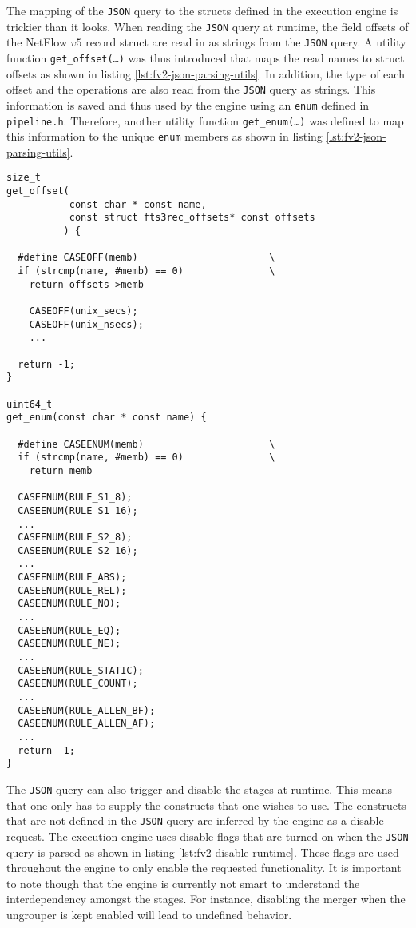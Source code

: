 The mapping of the \texttt{JSON} query to the structs defined in the execution
engine is trickier than it looks. When reading the \texttt{JSON} query at
runtime, the field offsets of the NetFlow $v5$ record struct are read in as
strings from the \texttt{JSON} query. A utility function
\texttt{get\_offset(\ldots)} was thus 
introduced that maps the read names to struct offsets as shown in listing
\ref{lst:fv2-json-parsing-utils}.  In addition, the type of each offset and
the operations are also read from the \texttt{JSON} query as strings. This
information is saved and thus used by the engine using an \texttt{enum}
defined in \texttt{pipeline.h}.  Therefore, another utility function
\texttt{get\_enum(\ldots)} was defined to map this information to the unique
\texttt{enum} members as shown in listing \ref{lst:fv2-json-parsing-utils}.


\begin{lstlisting}
size_t
get_offset(
           const char * const name,
           const struct fts3rec_offsets* const offsets
          ) {

  #define CASEOFF(memb)                       \
  if (strcmp(name, #memb) == 0)               \
    return offsets->memb

    CASEOFF(unix_secs);
    CASEOFF(unix_nsecs);
    ...

  return -1;
}

uint64_t
get_enum(const char * const name) {

  #define CASEENUM(memb)                      \
  if (strcmp(name, #memb) == 0)               \
    return memb

  CASEENUM(RULE_S1_8);
  CASEENUM(RULE_S1_16);
  ...
  CASEENUM(RULE_S2_8);
  CASEENUM(RULE_S2_16);
  ...
  CASEENUM(RULE_ABS);
  CASEENUM(RULE_REL);
  CASEENUM(RULE_NO);
  ...
  CASEENUM(RULE_EQ);
  CASEENUM(RULE_NE);
  ...
  CASEENUM(RULE_STATIC);
  CASEENUM(RULE_COUNT);
  ...
  CASEENUM(RULE_ALLEN_BF);
  CASEENUM(RULE_ALLEN_AF);
  ...
  return -1;
}
\end{lstlisting}

The \texttt{JSON} query can also trigger and disable the stages at runtime.
This means that one only has to supply the constructs that one wishes to use.
The constructs that are not defined in the \texttt{JSON} query are inferred by
the engine as a  disable
request. The execution engine uses disable flags that are turned on when the
\texttt{JSON} query is parsed as shown in listing
\ref{lst:fv2-disable-runtime}. These flags are used throughout the engine to
only enable the requested functionality. It is important to note though that
the engine is currently not smart to understand the interdependency amongst
the stages. For instance, disabling the merger when the ungrouper is kept
enabled will lead to undefined behavior.

